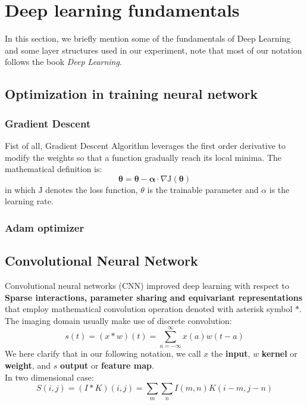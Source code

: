 \section{Deep learning fundamentals}
In this section, we briefly mention some of the fundamentals of Deep Learning and some layer structures used in our experiment, note that most of our notation follows the book \textit{Deep Learning}\cite{Goodfellow-et-al-2016}.

\subsection{Optimization in training neural network}
\subsubsection{Gradient Descent}
Fist of all, Gradient Descent Algorithm leverages the first order derivative to modify the weights so that a function gradually reach its local minima. The mathematical definition is:
$$\boldsymbol{\theta}=\boldsymbol{\theta}-\boldsymbol{\alpha} \cdot \nabla \mathrm{J}(\boldsymbol{\theta})$$ 
in which $\mathrm{J}$ denotes the loss function, $\theta$ is the trainable parameter and $\alpha$ is the learning rate. 
\subsubsection{Adam optimizer}

\subsection{Convolutional Neural Network}
Convolutional neural networks (CNN) improved deep learning with respect to \textbf{Sparse interactions, parameter sharing and equivariant representations} that employ mathematical convolution operation denoted with asterisk symbol $*$. The imaging domain usually make use of discrete convolution: $$s(t)=(x * w)(t)=\sum_{a=-\infty}^{\infty} x(a) w(t-a)$$
We here clarify that in our following notation, we call $x$ the \textbf{input}, $w$ \textbf{kernel} or \textbf{weight}, and $s$ \textbf{output} or \textbf{feature map}.\\
In two dimensional case:
$$S(i, j)=(I * K)(i, j)=\sum_{m} \sum_{n} I(m, n) K(i-m, j-n)$$
